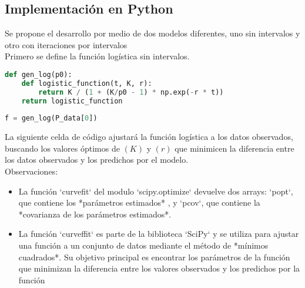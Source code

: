 \documentclass[a4paper,10pt,twocolumn]{article}
\begin{document}
	\subsection{Implementación en Python}\label{sub:python}
Se propone el desarrollo por medio de dos modelos diferentes, uno sin intervalos y otro con iteraciones por intervalos\\
Primero se define la función logística sin intervalos.
\begin{lstlisting}[language=Python, caption=Codigo función logística sin intervalos]
def gen_log(p0):
	def logistic_function(t, K, r):
		return K / (1 + (K/p0 - 1) * np.exp(-r * t))
	return logistic_function
				
f = gen_log(P_data[0])
\end{lstlisting}

La siguiente celda de código ajustará la función logística a los datos observados, buscando los valores óptimos de $(K)$ y $(r)$ que minimicen la diferencia entre los datos observados y los predichos por el modelo.\\ 
Observaciones:
\begin{itemize}
	\item La función `curvefit` del modulo `scipy.optimize` devuelve dos arrays: `popt`, que contiene los *parámetros estimados* , y `pcov`, que contiene la *covarianza de los parámetros estimados*.
	\item La función `curveffit` es parte de la biblioteca `SciPy` y se utiliza para ajustar una función a un conjunto de datos mediante el método de *mínimos cuadrados*. Su objetivo principal es encontrar los parámetros de la función que minimizan la diferencia entre los valores observados y los predichos por la función
\end{itemize}
\end{document}
